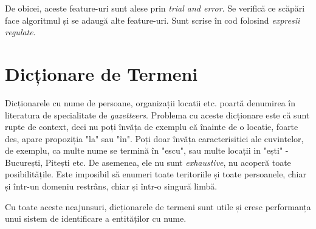 De obicei, aceste feature-uri sunt alese prin \textit{trial and error}. Se verifică ce scăpări face algoritmul și se adaugă alte feature-uri. Sunt scrise în cod folosind \textit{expresii regulate}.

\section{Dicționare de Termeni}
Dicționarele cu nume de persoane, organizații locatii etc. poartă denumirea în literatura de specialitate de \textit{gazetteers}. Problema cu aceste dicționare este că sunt rupte de context, deci nu poți învăța de exemplu că înainte de o locatie, foarte des, apare propoziția "la" sau "în". Poți doar învăța caracterisitici ale cuvintelor, de exemplu, ca multe nume se termină în "escu", sau multe locații in "ești" - București, Pitești etc. De asemenea, ele nu sunt \textit{exhaustive}, nu acoperă toate posibilitățile. Este imposibil să enumeri toate teritoriile și toate persoanele, chiar și într-un domeniu restrâns, chiar și într-o singură limbă.

Cu toate aceste neajunsuri, dicționarele de termeni sunt utile și cresc performanța unui sistem de identificare a entităților cu nume.







